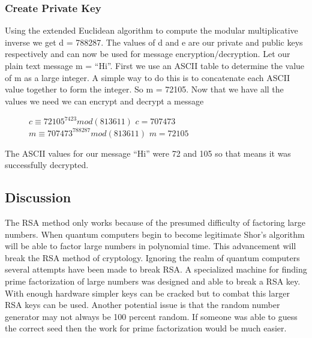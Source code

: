 \documentclass[conference]{IEEEtran}
\begin{document}
\subsubsection{Create Private Key}
Using the extended Euclidean algorithm to compute the modular multiplicative inverse we get d = 788287. The values of d and e are our private and public keys respectively and can now be used for message encryption/decryption. \newline \indent
Let our plain text message m = ``Hi''. First we use an ASCII table to determine the value of m as a large integer. A simple way to do this is to concatenate each ASCII value together to form the integer. So m = 72105. Now that we have all the values we need we can encrypt and decrypt a message
\begin{figure}[h]
	\begin{center}
		$c \equiv {72105}^{7423} mod (813611)$ \newline
		$c = 707473$ \newline
		$m \equiv {707473}^{788287} mod (813611)$ \newline
		$m = 72105$ \newline
	\end{center}
\end{figure}

The ASCII values for our message ``Hi'' were 72 and 105 so that means it was successfully decrypted.

\subsection{Discussion}
The RSA method only works because of the presumed difficulty of factoring large numbers. When quantum computers begin to become legitimate Shor's algorithm will be able to factor large numbers in polynomial time. This advancement will break the RSA method of cryptology. \newline
\indent Ignoring the realm of quantum computers several attempts have been made to break RSA. A specialized machine for finding prime factorization of large numbers was designed and able to break a RSA key. With enough hardware simpler keys can be cracked but to combat this larger RSA keys can be used.
\newline \indent
Another potential issue is that the random number generator may not always be 100 percent random. If someone was able to guess the correct seed then the work for prime factorization would be much easier.


\end{document}
